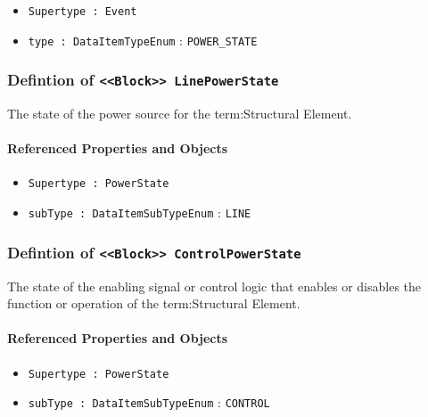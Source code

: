 \begin{itemize}
\item \texttt{Supertype : Event}

\item \texttt{type : DataItemTypeEnum} : \texttt{POWER_STATE}

\end{itemize}
\FloatBarrier
\subsubsection{Defintion of \texttt{<<Block>> LinePowerState}}
  \label{type:LinePowerState}

\FloatBarrier

The state of the power source for the {term:Structural Element}.

\FloatBarrier
\paragraph{Referenced Properties and Objects}

\begin{itemize}
\item \texttt{Supertype : PowerState}

\item \texttt{subType : DataItemSubTypeEnum} : \texttt{LINE}

\end{itemize}
\FloatBarrier
\subsubsection{Defintion of \texttt{<<Block>> ControlPowerState}}
  \label{type:ControlPowerState}

\FloatBarrier

The state of the enabling signal or control logic that enables or disables the function or operation of the {term:Structural Element}.

\FloatBarrier
\paragraph{Referenced Properties and Objects}

\begin{itemize}
\item \texttt{Supertype : PowerState}

\item \texttt{subType : DataItemSubTypeEnum} : \texttt{CONTROL}

\end{itemize}
\FloatBarrier
